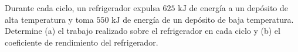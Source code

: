 \item Durante cada ciclo, un refrigerador expulsa $625\text{ kJ}$ de energía a un depósito de alta temperatura y toma $550\text{ kJ}$ de energía de un depósito de baja temperatura. Determine (a) el trabajo realizado sobre el refrigerador en cada ciclo y (b) el coeficiente de rendimiento del refrigerador.
